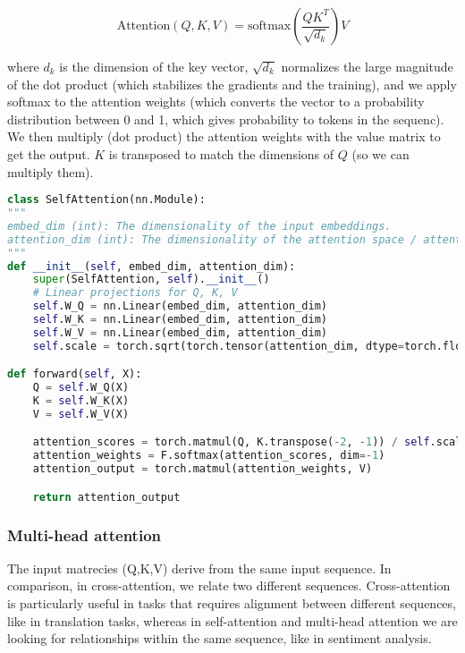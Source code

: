 \begin{equation*}
    \text{Attention}(Q, K, V) = \text{softmax}\left( \frac{QK^T}{\sqrt{d_k}} \right) V
\end{equation*}

where $d_k$ is the dimension of the key vector, $\sqrt{d_k}$ normalizes the large magnitude of the dot product (which stabilizes the gradients and the training), and we apply softmax to the attention weights (which converts the vector to a probability distribution between 0 and 1, which gives probability to tokens in the sequenc). We then multiply (dot product) the attention weights with the value matrix to get the output. $K$ is transposed to match the dimensions of $Q$ (so we can multiply them).

\begin{lstlisting}[language=Python, breaklines=true, caption={Full implementation of a single self-attention block.}]
class SelfAttention(nn.Module):
"""
embed_dim (int): The dimensionality of the input embeddings.
attention_dim (int): The dimensionality of the attention space / attention vectors (Q, K, V).
"""
def __init__(self, embed_dim, attention_dim):
    super(SelfAttention, self).__init__()
    # Linear projections for Q, K, V
    self.W_Q = nn.Linear(embed_dim, attention_dim)
    self.W_K = nn.Linear(embed_dim, attention_dim)
    self.W_V = nn.Linear(embed_dim, attention_dim)
    self.scale = torch.sqrt(torch.tensor(attention_dim, dtype=torch.float32))

def forward(self, X):
    Q = self.W_Q(X)
    K = self.W_K(X)
    V = self.W_V(X)

    attention_scores = torch.matmul(Q, K.transpose(-2, -1)) / self.scale
    attention_weights = F.softmax(attention_scores, dim=-1)
    attention_output = torch.matmul(attention_weights, V)

    return attention_output
\end{lstlisting}










\subsubsection{Multi-head attention}

The input matrecies (Q,K,V) derive from the same input sequence. In comparison, in cross-attention, we relate two different sequences. Cross-attention is particularly useful in tasks that requires alignment between different sequences, like in translation tasks, whereas in self-attention and multi-head attention we are looking for relationships within the same sequence, like in sentiment analysis.

